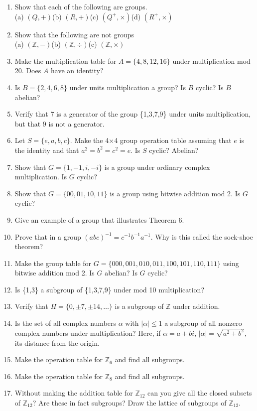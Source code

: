 \documentclass[12pt]{book}
\theoremstyle{definition}
\def\Z{\mathbb{Z}}
\begin{document}
\begin{enumerate}
\item Show that each of the following are groups.\\
(a) $(Q,+)$\qquad(b) $(R,+)$\qquad(c) $(Q^+,\times)$\qquad(d) $(R^+,\times)$
\item Show that the following are not groups\\
(a) $(\Z,-)$\qquad (b) $(\Z,\div)$\qquad (c) $(\Z,\times)$
\item Make the multiplication table for $A=\{4,8,12,16\}$ under multiplication mod 20.  Does $A$ have an identity?
\item Is $B=\{2,4,6,8\}$ under units multiplication a group?  Is $B$ cyclic?  Is $B$ abelian?
\item Verify that 7 is a generator of the group \{1,3,7,9\} under units multiplication, but that 9 is not a generator.
\item Let $S=\{e,a,b,c\}$.  Make the 4$\times$4 group operation table assuming that $e$ is the identity and that $a^2=b^2=c^2=e$.  Is $S$ cyclic?  Abelian?
\item Show that $G=\{1,-1,i,-i\}$ is a group under ordinary complex multiplication.  Is $G$ cyclic?
\item Show that $G=\{00,01,10,11\}$ is a group using bitwise addition mod 2.  Is $G$ cyclic?
\item Give an example of a group that illustrates Theorem 6.
\item Prove that in a group $(abc)^{-1}=c^{-1}b^{-1}a^{-1}$.  Why is this called the sock-shoe theorem?
\item Make the group table for $G=\{000,001,010,011,100,101,110,111\}$ using bitwise addition mod 2.  Is $G$ abelian?  Is $G$ cyclic?
\item Is \{1,3\} a subgroup of \{1,3,7,9\} under mod 10 multiplication?
\item Verify that $H=\{0,\pm7,\pm14,\dots\}$ is a subgroup of $\Z$ under addition.
\item Is the set of all complex numbers $\alpha$ with $|\alpha|\leq1$ a subgroup of all nonzero complex numbers under multiplication?  Here, if $\alpha = a+bi$, $|\alpha|=\sqrt{a^2+b^2}$, its distance from the origin.
\item Make the operation table for $\Z_6$ and find all subgroups.
\item Make the operation table for $\Z_8$ and find all subgroups.
\item Without making the addition table for $\Z_{12}$ can you give all the closed subsets of $\Z_{12}$?  Are these in fact subgroups?  Draw the lattice of subgroups of $\Z_{12}$.

\end{enumerate}
\end{document}
